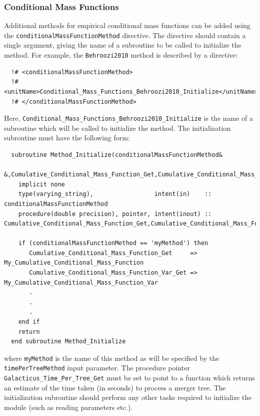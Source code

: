 \subsubsection{Conditional Mass Functions}

Additional methods for empirical conditional mass functions can be added using the {\tt conditionalMassFunctionMethod} directive. The directive should contain a single argument, giving the name of a subroutine to be called to initialize the method. For example, the {\tt Behroozi2010} method is described by a directive:
\begin{verbatim}
  !# <conditionalMassFunctionMethod>
  !#  <unitName>Conditional_Mass_Functions_Behroozi2010_Initialize</unitName>
  !# </conditionalMassFunctionMethod>
\end{verbatim}
Here, {\tt Conditional\_Mass\_Functions\_Behroozi2010\_Initialize} is the name of a subroutine which will be called to initialize the method. The initialization subroutine must have the following form:
\begin{verbatim}
  subroutine Method_Initialize(conditionalMassFunctionMethod&
       &,Cumulative_Conditional_Mass_Function_Get,Cumulative_Conditional_Mass_Function_Var_Get)
    implicit none
    type(varying_string),                 intent(in)    :: conditionalMassFunctionMethod
    procedure(double precision), pointer, intent(inout) :: Cumulative_Conditional_Mass_Function_Get,Cumulative_Conditional_Mass_Function_Var_Get
    
    if (conditionalMassFunctionMethod == 'myMethod') then
       Cumulative_Conditional_Mass_Function_Get     => My_Cumulative_Conditional_Mass_Function
       Cumulative_Conditional_Mass_Function_Var_Get => My_Cumulative_Conditional_Mass_Function_Var
       .
       .
       .
    end if
    return
  end subroutine Method_Initialize
\end{verbatim}
where {\tt myMethod} is the name of this method as will be specified by the {\tt timePerTreeMethod} input parameter. The procedure pointer {\tt Galacticus\_Time\_Per\_Tree\_Get} must be set to point to a function which returns an estimate of the time taken (in seconds) to process a merger tree. The initialization subroutine should perform any other tasks required to initialize the module (such as reading parameters etc.).

